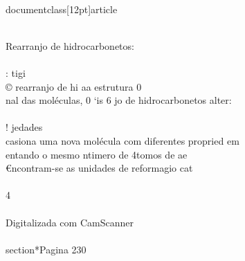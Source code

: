 \\documentclass[12pt]{article}
\begin{document}
\\
Rearranjo de hidrocarbonetos:\\
\\
: tigi\\
© rearranjo de hi aa estrutura 0\\
nal das moléculas, 0 ‘is 6 jo de hidrocarbonetos alter:\\
\\
! jedades\\
casiona uma nova molécula com diferentes propried em\\
entando o mesmo ntimero de 4tomos de ae\\
€ncontram-se as unidades de reformagio cat\\
\\
4\\
\\
Digitalizada com CamScanner\\

\\section*{Pagina 230}
\end{document}
